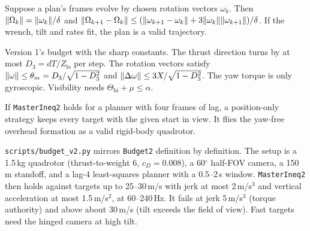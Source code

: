 \begin{theorem}
\label{thm:rotplan}
\leanok
{}
Suppose a plan's frames evolve by chosen rotation vectors $\omega_k$. Then
$\lVert \Omega_k \rVert=\lVert \omega_k \rVert/\delta$ and
$\lVert \Omega_{k+1}-\Omega_k \rVert\le(\lVert \omega_{k+1}-\omega_k \rVert+3\lVert \omega_k \rVert\lVert \omega_{k+1} \rVert)/\delta$.
If the wrench, tilt and rates fit, the plan is a valid trajectory.
\end{theorem}

\begin{definition}
\label{def:budget2}
\leanok
{}
Version 1's budget with the sharp constants. The thrust direction turns by at most
$D_3=dT/Z_{\mathrm{lo}}$ per step. The rotation vectors satisfy
$\lVert \omega \rVert\le\theta_m=D_3/\sqrt{1-D_3^2}$ and
$\lVert \Delta\omega \rVert\le3X/\sqrt{1-D_3^2}$. The yaw torque is only gyroscopic. Visibility
needs $\Theta_{\mathrm{hi}}+\mu\le\alpha$.
\end{definition}

\begin{theorem}
\label{thm:master2}
\leanok
{}
If \texttt{MasterIneq2} holds for a planner with four frames of lag, a position-only
strategy keeps every target with the given start in view. It flies the yaw-free
overhead formation as a valid rigid-body quadrotor.
\end{theorem}

\begin{remark}
\texttt{scripts/budget\_v2.py} mirrors \texttt{Budget2} definition by definition. The
setup is a 1.5\,kg quadrotor (thrust-to-weight 6, $c_D=0.008$), a 60$^\circ$ half-FOV
camera, a 150\,m standoff, and a lag-4 least-squares planner with a 0.5--2\,s window.
\texttt{MasterIneq2} then holds against targets up to 25--30\,m/s with jerk at most
2\,m/s$^3$ and vertical acceleration at most 1.5\,m/s$^2$, at 60--240\,Hz. It fails at
jerk 5\,m/s$^3$ (torque authority) and above about 30\,m/s (tilt exceeds the field of
view). Fast targets need the hinged camera at high tilt.
\end{remark}
